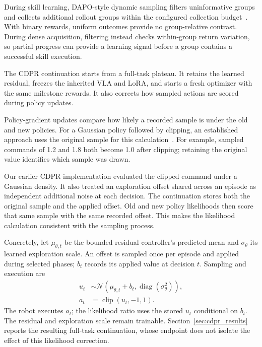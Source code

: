 During skill learning, DAPO-style dynamic sampling filters uninformative groups and collects additional rollout groups within the configured collection budget~\cite{dapo}. With binary rewards, uniform outcomes provide no group-relative contrast. During dense acquisition, filtering instead checks within-group return variation, so partial progress can provide a learning signal before a group contains a successful skill execution.

The CDPR continuation starts from a full-task plateau. It retains the learned residual, freezes the inherited VLA and LoRA, and starts a fresh optimizer with the same milestone rewards. It also corrects how sampled actions are scored during policy updates.

Policy-gradient updates compare how likely a recorded sample is under the old and new policies. For a Gaussian policy followed by clipping, an established approach uses the original sample for this calculation~\cite{capg}. For example, sampled commands of 1.2 and 1.8 both become 1.0 after clipping; retaining the original value identifies which sample was drawn.

Our earlier CDPR implementation evaluated the clipped command under a Gaussian density. It also treated an exploration offset shared across an episode as independent additional noise at each decision. The continuation stores both the original sample and the applied offset. Old and new policy likelihoods then score that same sample with the same recorded offset. This makes the likelihood calculation consistent with the sampling process.

Concretely, let $\mu_{\theta,t}$ be the bounded residual controller's predicted mean and $\sigma_\theta$ its learned exploration scale. An offset is sampled once per episode and applied during selected phases; $b_t$ records its applied value at decision $t$. Sampling and execution are
\begin{equation}
\begin{aligned}
u_t&\sim\mathcal N(\mu_{\theta,t}+b_t,\operatorname{diag}(\sigma_\theta^2)),\\
a_t&=\operatorname{clip}(u_t,-1,1).
\end{aligned}
\label{eq:latent_action}
\end{equation}
The robot executes $a_t$; the likelihood ratio uses the stored $u_t$ conditional on $b_t$. The residual and exploration scale remain trainable. Section~\ref{sec:cdpr_results} reports the resulting full-task continuation, whose endpoint does not isolate the effect of this likelihood correction.




